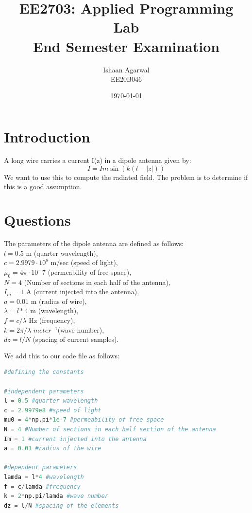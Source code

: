 \documentclass[11pt, a4paper]{article}
\title{EE2703: Applied Programming Lab \\ End Semester Examination} %
\author{Ishaan Agarwal \\ EE20B046} %
\date{\today} %
\begin{document}
		
		
\maketitle %

\section{Introduction}
A long wire carries a current I(z) in a dipole antenna given by:
\[I = Im\sin(k(l - |z|))\]
We want to use this to compute the radiated field. The problem is to determine if this is a good assumption. 

\section{Questions}
The parameters of the dipole antenna are defined as follows:\\$l = 0.5$ m (quarter wavelength),\\ $c = 2.9979 \cdot 10^8$ m/sec (speed of light),\\ $\mu_0 = 4 \pi \cdot 10^-7$ (permeability of free space),\\ $N = 4$ (Number of sections in each half of the antenna),\\
$I_m = 1$ A (current injected into the antenna),\\ $a = 0.01$ m (radius of wire),\\ $\lambda = l * 4$ m (wavelength),\\
$f = c / \lambda$ Hz (frequency),\\ $k = 2 \pi / \lambda$ $meter^{-1}$(wave number),\\ $dz = l / N$ (spacing of current samples).

We add this to our code file as follows:\\
\begin{lstlisting}[language = Python]
#defining the constants

#independent parameters
l = 0.5 #quarter wavelength
c = 2.9979e8 #speed of light
mu0 = 4*np.pi*1e-7 #permeability of free space
N = 4 #Number of sections in each half section of the antenna
Im = 1 #current injected into the antenna
a = 0.01 #radius of the wire

#dependent parameters
lamda = l*4 #wavelength 
f = c/lamda #frequency
k = 2*np.pi/lamda #wave number
dz = l/N #spacing of the elements


\end{lstlisting}
\end{document}
